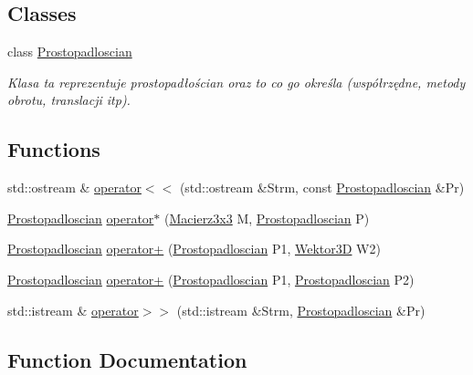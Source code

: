 \subsection*{Classes}
\begin{DoxyCompactItemize}
\item 
class \hyperlink{class_prostopadloscian}{Prostopadloscian}
\begin{DoxyCompactList}\small\item\em Klasa ta reprezentuje prostopadłościan oraz to co go określa (współrzędne, metody obrotu, translacji itp). \end{DoxyCompactList}\end{DoxyCompactItemize}
\subsection*{Functions}
\begin{DoxyCompactItemize}
\item 
std\+::ostream \& \hyperlink{_prostopadloscian_8hh_a0a77f9bb1cc3f07e11031b947e6e7322}{operator$<$$<$} (std\+::ostream \&Strm, const \hyperlink{class_prostopadloscian}{Prostopadloscian} \&Pr)
\item 
\hyperlink{class_prostopadloscian}{Prostopadloscian} \hyperlink{_prostopadloscian_8hh_a0c34886e02f7ad596e7ae26ef4bdc44f}{operator$\ast$} (\hyperlink{_macierz3x3_8hh_ad4fc7b0e263d9a99ba6174f68b52ea87}{Macierz3x3} M, \hyperlink{class_prostopadloscian}{Prostopadloscian} P)
\item 
\hyperlink{class_prostopadloscian}{Prostopadloscian} \hyperlink{_prostopadloscian_8hh_aed7fb32f55c347f1ffbbdb209d41fa04}{operator+} (\hyperlink{class_prostopadloscian}{Prostopadloscian} P1, \hyperlink{_wektor3_d_8hh_ac353a272b38b4ad342f7181ad7bdb91a}{Wektor3D} W2)
\item 
\hyperlink{class_prostopadloscian}{Prostopadloscian} \hyperlink{_prostopadloscian_8hh_ae86d86b37f5a8a4fb819b121ef0473d5}{operator+} (\hyperlink{class_prostopadloscian}{Prostopadloscian} P1, \hyperlink{class_prostopadloscian}{Prostopadloscian} P2)
\item 
std\+::istream \& \hyperlink{_prostopadloscian_8hh_a002ba87e7198bb0f1a42575278b379d8}{operator$>$$>$} (std\+::istream \&Strm, \hyperlink{class_prostopadloscian}{Prostopadloscian} \&Pr)
\end{DoxyCompactItemize}


\subsection{Function Documentation}
\mbox{\label{_prostopadloscian_8hh_a0c34886e02f7ad596e7ae26ef4bdc44f}} 
